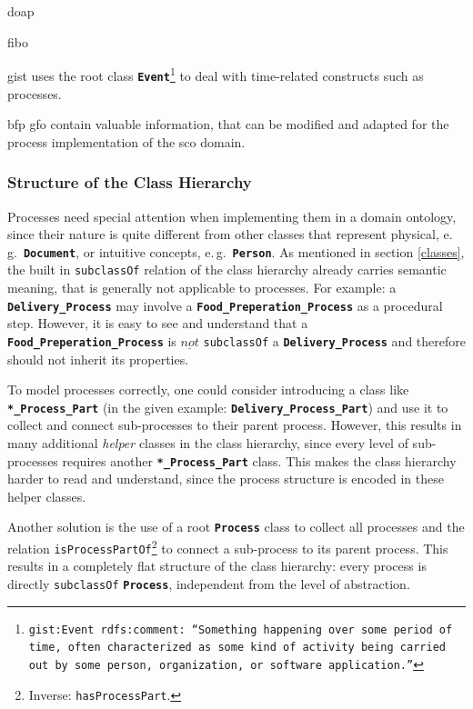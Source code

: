 \documentclass[a4paper, DIV=13, BCOR=0cm]{scrbook}
\newcommand{\eg}{e.\,g.\ }
\newcommand{\class}[1]{\texttt{\textbf{#1}}}
\newcommand{\relation}[1]{\texttt{#1}}
\newcommand{\foottt}[1]{\footnote{\texttt{#1}}}
\begin{document}
\gls{doap}

\gls{fibo}

\gls{gist} uses the root class \class{Event}\foottt{gist:Event rdfs:comment: \enquote{Something happening over some period of time, often characterized as some kind of activity being carried out by some person, organization, or software application.}} to deal with time-related constructs such as processes.

bfp gfo contain valuable information, that can be modified and adapted for the process implementation of the \gls{sco} domain.


\subsubsection{Structure of the Class Hierarchy }
\label{process-subclass}
Processes need special attention when implementing them in a domain ontology, since their nature is quite different from other classes that represent physical, \eg \class{Document}, or intuitive concepts, \eg \class{Person}. As mentioned in section \ref{classes}, the built in \relation{subclassOf} relation of the class hierarchy already carries semantic meaning, that is generally not applicable to processes. For example: a \class{Delivery\_Process} may involve a \class{Food\_Preperation\_Process} as a procedural step. However, it is easy to see and understand that a \class{Food\_Preperation\_Process} is $\underline{not}$ \relation{subclassOf} a \class{Delivery\_Process} and therefore should not inherit its properties.

To model processes correctly, one could consider introducing a class like \class{*\_Process\_Part} (in the given example: \class{Delivery\_Process\_Part}) and use it to collect and connect sub-processes to their parent process. However, this results in many additional \textit{helper} classes in the class hierarchy, since every level of sub-processes requires another \class{*\_Process\_Part} class. This makes the class hierarchy harder to read and understand, since the process structure is encoded in these helper classes.

Another solution is the use of a root \class{Process} class to collect all processes and the relation \relation{isProcessPartOf}\footnote{Inverse: \relation{hasProcessPart}.} to connect a sub-process to its parent process. This results in a completely flat structure of the class hierarchy: every process is directly \relation{subclassOf} \class{Process}, independent from the level of abstraction.
\end{document}
